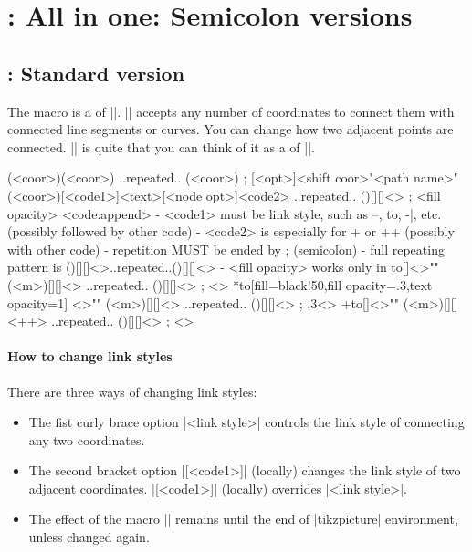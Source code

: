 \section{\protect\cmd{\tzlinks}: All in one: Semicolon versions}
\label{s:tzlinks}

\subsection{\protect\cmd{\tzlinks}: Standard version}
\label{ss:tzlinks}

The macro \icmd{\tzlinks} is a  of |\tzlink|. |\tzlinks| accepts any number of coordinates to connect them with connected line segments or curves.
You can change how two adjacent points are connected.
|\tzlinks| is quite  that you can think of it as a  of |\tzlines|.


\begin{tzdef}{}
\tzlinks (<coor>)(<coor>) ..repeated.. (<coor>) ;
[<opt>]<shift coor>"<path name>"
        (<coor>)[<code1>]{<text>}[<node opt>]<code2>
        ..repeated.. ()[]{}[]<> ; {<fill opacity>} <code.append>
  - <code1> must be link style, such as --, to, -|, etc.
           (possibly followed by other code)
  - <code2> is especially for + or ++
           (possibly with other code)
  - repetition MUST be ended by ; (semicolon)
  - full repeating pattern is ()[]{}[]<>..repeated..()[]{}[]<>
  - {<fill opacity>} works only in \tzlinks*
  {to}[]<>"" (<m>)[]{}[]<>   ..repeated.. ()[]{}[]<> ; {  }<>
 *{to}[fill=black!50,fill opacity=.3,text opacity=1]
        <>"" (<m>)[]{}[]<>   ..repeated.. ()[]{}[]<> ; {.3}<>
 +{to}[]<>"" (<m>)[]{}[]<++> ..repeated.. ()[]{}[]<> ; {  }<>
\end{tzdef}

\paragraph{How to change link styles}
There are three ways of changing link styles:
\begin{itemize}\firmlist
\item The fist curly brace option |{<link style>}| controls the link style of connecting any two coordinates.
\item The second bracket option |[<code1>]| (locally) changes the link style of two adjacent coordinates. |[<code1>]| (locally) overrides |{<link style>}|.
\item The effect of the macro |\settzlinkstyle| remains until the end of |tikzpicture| environment, unless changed again.
\end{itemize}

